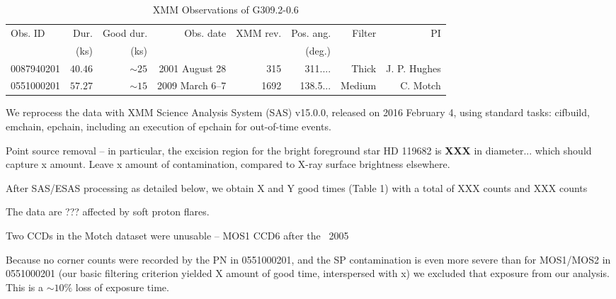 \documentclass[preprint2,tighten,trackchanges]{aastex6}
\newcommand*{\abt}{\mathord{\sim}} %
\begin{document}
\begin{table*}
    \centering
    \caption{XMM Observations of G309.2-0.6}
    \begin{tabular}{@{}lrrrrrrr@{}}
        \toprule
        Obs. ID & Dur. & Good dur. & Obs. date & XMM rev. & Pos. ang. & Filter & PI \\
                & (ks)     & (ks)                &      &          & (deg.)    &        &    \\
        \midrule
        0087940201 & $40.46$ & $\abt25$ & 2001 August 28 & 315 & 311.... & Thick & J. P. Hughes \\
        0551000201 & $57.27$ & $\abt15$ & 2009 March 6--7 & 1692 & 138.5... & Medium & C. Motch \\
        \bottomrule
    \end{tabular}
\end{table*}


We reprocess the data with XMM Science Analysis System (SAS) v15.0.0, released
on 2016 February 4, using standard tasks: cifbuild, emchain, epchain,
including an execution of epchain for out-of-time events.

Point source removal -- in particular, the excision region for the bright
foreground star HD 119682 is \textbf{XXX} in diameter... which should capture x
amount.  Leave x amount of contamination, compared to X-ray surface brightness
elsewhere.

After SAS/ESAS processing as detailed below, we obtain X and Y good times
(Table 1) with a total of XXX counts and XXX counts

The data are ??? affected by soft proton flares.

Two CCDs in the Motch dataset were unusable -- MOS1 CCD6 after the ~2005

Because no corner counts were recorded by the PN in 0551000201,
and the SP contamination is even more severe than for MOS1/MOS2 in 0551000201
(our basic filtering criterion yielded X amount of good time, interspersed with
x)
we excluded that exposure from our analysis.  This is a $\abt 10\%$ loss of
exposure time.
\end{document}

